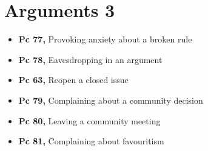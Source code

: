 \chapter{Arguments 3}

\begin{itemize}
\tightlist
\item
  \textbf{Pc 77,} Provoking anxiety about a broken rule
\item
  \textbf{Pc 78,} Eavesdropping in an argument
\item
  \textbf{Pc 63,} Reopen a closed issue
\item
  \textbf{Pc 79,} Complaining about a community decision
\item
  \textbf{Pc 80,} Leaving a community meeting
\item
  \textbf{Pc 81,} Complaining about favouritism
\end{itemize}

